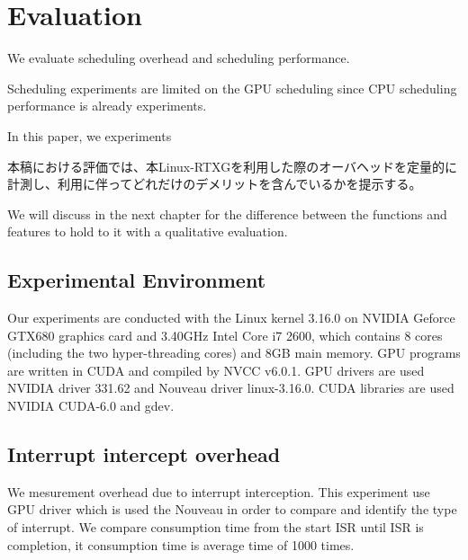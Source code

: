 \section{Evaluation}
We evaluate scheduling overhead and scheduling performance.

Scheduling experiments are limited on the GPU scheduling since CPU scheduling performance is already experiments\cite{kato:resch}.

In this paper, we experiments 

本稿における評価では、本Linux-RTXGを利用した際のオーバヘッドを定量的に計測し、利用に伴ってどれだけのデメリットを含んでいるかを提示する。



We will discuss in the next chapter for the difference between the functions and features to hold to it with a qualitative evaluation.


\subsection{Experimental Environment}
Our experiments are conducted with the Linux kernel 3.16.0 on NVIDIA Geforce GTX680 graphics card and 3.40GHz Intel Core i7 2600, which contains 8 cores (including the two hyper-threading cores) and 8GB main memory.
GPU programs are written in CUDA and compiled by NVCC v6.0.1.
GPU drivers are used NVIDIA driver 331.62 and Nouveau driver linux-3.16.0.
CUDA libraries are used NVIDIA CUDA-6.0 and gdev.

\subsection{Interrupt intercept overhead}
We mesurement overhead due to interrupt interception.
This experiment use GPU driver which is used the Nouveau in order to compare and identify the type of interrupt.
We compare consumption time from the start ISR until ISR is completion, it consumption time is average time of 1000 times.

